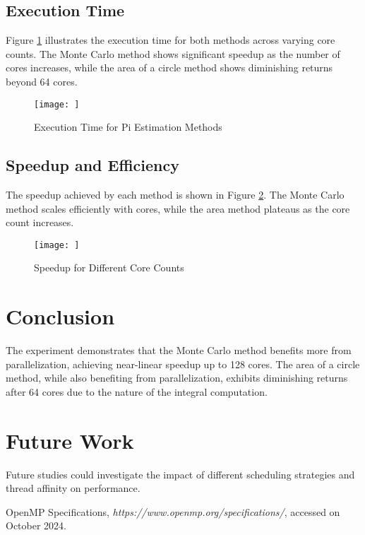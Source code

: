 \documentclass[conference]{IEEEtran}
\begin{document}
\subsection{Execution Time}
Figure \ref{fig:execution_time} illustrates the execution time for both methods across varying core counts. The Monte Carlo method shows significant speedup as the number of cores increases, while the area of a circle method shows diminishing returns beyond 64 cores.

\begin{figure}[H]
    \centering
    \texttt{[image: ]}
    \caption{Execution Time for Pi Estimation Methods}
    \label{fig:execution_time}
\end{figure}

\subsection{Speedup and Efficiency}
The speedup achieved by each method is shown in Figure \ref{fig:speedup}. The Monte Carlo method scales efficiently with cores, while the area method plateaus as the core count increases.

\begin{figure}[H]
    \centering
    \texttt{[image: ]}
    \caption{Speedup for Different Core Counts}
    \label{fig:speedup}
\end{figure}

\section{Conclusion}
The experiment demonstrates that the Monte Carlo method benefits more from parallelization, achieving near-linear speedup up to 128 cores. The area of a circle method, while also benefiting from parallelization, exhibits diminishing returns after 64 cores due to the nature of the integral computation.

\section{Future Work}
Future studies could investigate the impact of different scheduling strategies and thread affinity on performance.

\begin{thebibliography}{1}
 OpenMP Specifications, \textit{https://www.openmp.org/specifications/}, accessed on October 2024.
\end{thebibliography}
\end{document}

